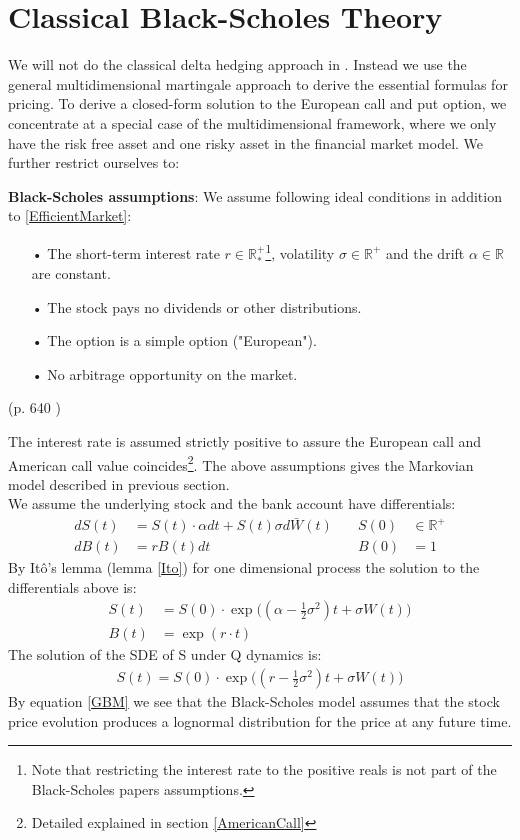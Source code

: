 \section{Classical Black-Scholes Theory}\label{classicBS}
We will not do the classical delta hedging approach in \parencite{B-S-Paper}. Instead we use the general multidimensional martingale approach to derive the essential formulas for pricing. 
To derive a closed-form solution to the European call and put option, we concentrate at a special case of the multidimensional framework, where we only have the risk free asset and one risky asset in the financial market model. 
We further restrict ourselves to:
\theoremstyle{assumption}
\begin{assumption}{\textbf{Black-Scholes assumptions}:}\label{BS-Assumption}
We assume following ideal conditions in addition to \eqref{EfficientMarket}:
\begin{enumerate}
\item[•] The short-term interest rate $r\in \mathbb{R}^+_*$\footnote{Note that restricting the interest rate to the positive reals is not part of the Black-Scholes papers assumptions.}, volatility $\sigma \in \mathbb{R}^+$ and the drift $\alpha\in \mathbb{R}$ are constant.
\item[•] The stock pays no dividends or other distributions.
\item[•] The option is a simple option ("European").
\item[•] No arbitrage opportunity on the market.
\end{enumerate}
\null \hfill (p. 640 \parencite{B-S-Paper})
\end{assumption}
The interest rate is assumed strictly positive to assure the European call and American call value coincides\footnote{Detailed explained in section \ref{AmericanCall}}. The above assumptions gives the Markovian model described in previous section. \\

We assume the underlying stock and the bank account have differentials:
\begin{align*}
dS(t)&=S(t)\cdot \alpha dt+S(t) \sigma d\bar{W}(t) \quad & S(0) &\in \mathbb{R}^+ \\
dB(t)&=r B(t)dt \quad & B(0) &= 1
\end{align*}
By Itô's lemma (lemma \ref{Ito}) for one dimensional process the solution to the differentials above is:
\begin{align*}
S(t)&=S(0) \cdot \exp \bigg( (\alpha -\frac{1}{2} \sigma^2) t + \sigma W(t) \bigg) \\
B(t)&=\exp(r\cdot t)
\end{align*}
The solution of the SDE of S under Q dynamics is:
\begin{equation}\label{GBM}
\begin{split}
S(t)=S(0) \cdot \exp \bigg( (r -\frac{1}{2} \sigma^2) t + \sigma W(t) \bigg)
\end{split}
\end{equation}
By equation \eqref{GBM} we see that the Black-Scholes model assumes that the stock price evolution produces a lognormal distribution for the price at any future time. \\

